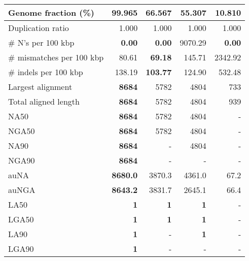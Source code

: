 \documentclass[12pt,a4paper]{article}
\begin{document}
\begin{table}[ht]
\begin{center}
\begin{tabular}{|l*{4}{|r}|}
Genome fraction (\%) & {\bf 99.965} & 66.567 & 55.307 & 10.810 \\ \hline
Duplication ratio & 1.000 & 1.000 & 1.000 & 1.000 \\ \hline
\# N's per 100 kbp & {\bf 0.00} & {\bf 0.00} & 9070.29 & {\bf 0.00} \\ \hline
\# mismatches per 100 kbp & 80.61 & {\bf 69.18} & 145.71 & 2342.92 \\ \hline
\# indels per 100 kbp & 138.19 & {\bf 103.77} & 124.90 & 532.48 \\ \hline
Largest alignment & {\bf 8684} & 5782 & 4804 & 733 \\ \hline
Total aligned length & {\bf 8684} & 5782 & 4804 & 939 \\ \hline
NA50 & {\bf 8684} & 5782 & 4804 & - \\ \hline
NGA50 & {\bf 8684} & 5782 & 4804 & - \\ \hline
NA90 & {\bf 8684} & - & 4804 & - \\ \hline
NGA90 & {\bf 8684} & - & - & - \\ \hline
auNA & {\bf 8680.0} & 3870.3 & 4361.0 & 67.2 \\ \hline
auNGA & {\bf 8643.2} & 3831.7 & 2645.1 & 66.4 \\ \hline
LA50 & {\bf 1} & {\bf 1} & {\bf 1} & - \\ \hline
LGA50 & {\bf 1} & {\bf 1} & {\bf 1} & - \\ \hline
LA90 & {\bf 1} & - & {\bf 1} & - \\ \hline
LGA90 & {\bf 1} & - & - & - \\ \hline
\end{tabular}
\end{center}
\end{table}
\end{document}
